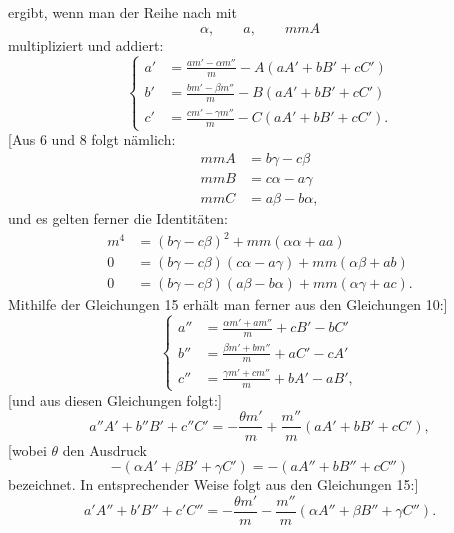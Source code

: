 %
\noindent ergibt, wenn man der Reihe nach mit
\[
\alpha,\qquad a,\qquad mmA
\]
multipliziert und addiert:
\begin{equation}\tag*{[15]}
\left\{\begin{aligned}
a'&=\frac{am'-\alpha m''}{m}-A(aA'+bB'+cC')\\
b'&=\frac{bm'-\beta m''}{m}-B(aA'+bB'+cC')\\
c'&=\frac{cm'-\gamma m''}{m}-C(aA'+bB'+cC').
\end{aligned}\right.
\end{equation}
[Aus 6 und 8 folgt nämlich:
\[
\begin{aligned}
mmA&=b\gamma-c\beta\\
mmB&=c\alpha-a\gamma\\
mmC&=a\beta-b\alpha,
\end{aligned}
\]
und es gelten ferner die Identitäten:
\[
\begin{aligned}
m^4&=(b\gamma-c\beta)^2+mm(\alpha\alpha+aa)\\
0&=(b\gamma-c\beta)(c\alpha-a\gamma)+mm(\alpha\beta+ab)\\
0&=(b\gamma-c\beta)(a\beta-b\alpha)+mm(\alpha\gamma+ac).
\end{aligned}
\]
\indent Mithilfe der Gleichungen 15 erhält man ferner aus den Gleichungen 10:]
\begin{equation}\tag*{[16]}
\left\{\begin{aligned}
a''&=\frac{\alpha m'+am''}{m}+cB'-bC'\\
b''&=\frac{\beta m'+bm''}{m}+aC'-cA'\\
c''&=\frac{\gamma m'+cm''}{m}+bA'-aB',
\end{aligned}\right.
\end{equation}
[und aus diesen Gleichungen folgt:]
\begin{equation}\tag*{[17]}
a''A'+b''B'+c''C'=-\frac{\theta m'}{m}+\frac{m''}{m}(aA'+bB'+cC'),
\end{equation}
[wobei $\theta$ den Ausdruck
\[
-(\alpha A'+\beta B'+\gamma C')=-(aA''+bB''+cC'')
\]
bezeichnet. In entsprechender Weise folgt aus den Gleichungen 15:]
\begin{equation}\tag*{[18]}
a'A''+b'B''+c'C''=-\frac{\theta m'}{m}-\frac{m''}{m}(\alpha A''+\beta B''+\gamma C'').
\end{equation}
